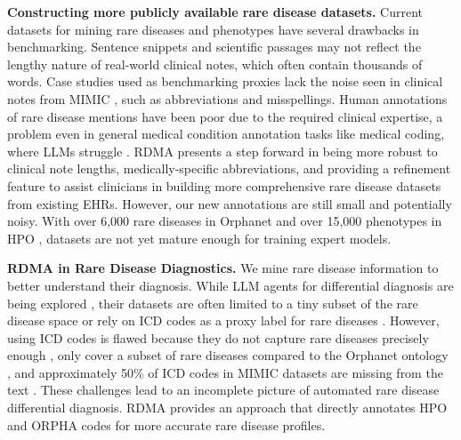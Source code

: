 \textbf{Constructing more publicly available rare disease datasets.} Current datasets for mining rare diseases and phenotypes \cite{lobo2017identifying_human_phenotype_terms,garcia2024_HPORAG,dong2023ontology_poor_annotations,martínezdemiguel2021rarediscorpuscorpusannotated} have several drawbacks in benchmarking. Sentence snippets and scientific passages \cite{lobo2017identifying_human_phenotype_terms,martínezdemiguel2021rarediscorpuscorpusannotated} may not reflect the lengthy nature of real-world clinical notes, which often contain thousands of words. Case studies used as benchmarking proxies \cite{garcia2024_HPORAG} lack the noise seen in clinical notes from MIMIC \cite{johnson2016mimic3,johnson2023mimic4}, such as abbreviations and misspellings. Human annotations of rare disease mentions \cite{dong2023ontology_poor_annotations} have been poor due to the required clinical expertise, a problem even in general medical condition annotation tasks like medical coding, where LLMs struggle \cite{soroush2024largelanguagemodelsarePoorMedicalCoders,wang2024drg}. RDMA presents a step forward in being more robust to clinical note lengths, medically-specific abbreviations, and providing a refinement feature to assist clinicians in building more comprehensive rare disease datasets from existing EHRs. However, our new annotations are still small and potentially noisy. With over 6,000 rare diseases in Orphanet \cite{weinreich2008orphanet} and over 15,000 phenotypes in HPO \cite{gargano2024mode_hpo}, datasets are not yet mature enough for training expert models.

\textbf{RDMA in Rare Disease Diagnostics.} We mine rare disease information to better understand their diagnosis. While LLM agents for differential diagnosis are being explored \cite{chen2025rareagentsadvancingraredisease}, their datasets are often limited to a tiny subset of the rare disease space \cite{chen2024rarebenchllmsserverare} or rely on ICD codes as a proxy label for rare diseases \cite{chen2025rareagentsadvancingraredisease}. However, using ICD codes is flawed because they do not capture rare diseases precisely enough \cite{mazzucato2023orphacodes_better}, only cover a subset of rare diseases compared to the Orphanet ontology \cite{kodra2012classification_icd_incomplete}, and approximately 50\% of ICD codes in MIMIC datasets are missing from the text \cite{cheng-etal-2023-mdace}. These challenges lead to an incomplete picture of automated rare disease differential diagnosis. RDMA provides an approach that directly annotates HPO and ORPHA codes for more accurate rare disease profiles.

